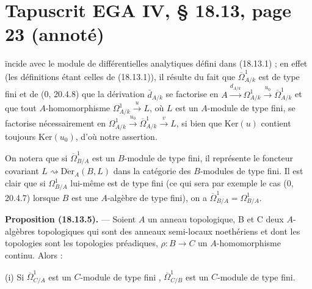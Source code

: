 \documentclass[11pt,a4paper]{article}
\begin{document}
\section*{Tapuscrit EGA IV, § 18.13, page 23 (annoté)}



ïncide avec le module de différentielles analytiques défini dans (18.13.1) ;
en effet  (les définitions étant celles de (18.13.1)), il résulte du fait que
$\overline{\Omega}^1_{A/k}$ est de type fini et de (0, 20.4.8) que la
dérivation $\bar d_{A/k}$ se factorise en $A \xrightarrow{d_{A/k}}
\Omega^1_{A/k} \xrightarrow{u_0} \overline{\Omega}^1_{A/k}$ et que tout
$A$-homomorphisme $\Omega^1_{A/k} \xrightarrow{u} L$, où $L$ est un $A$-module
de type fini, se factorise nécessairement en $\Omega^1_{A/k}
\xrightarrow{u_0} \overline{\Omega}^1_{A/k} \xrightarrow{v} L$, si bien que
$\mathrm{Ker}(u)$ contient toujours $\mathrm{Ker}(u_0)$, d'où notre assertion.

On notera que si $\overline{\Omega}^1_{B/A}$ est un $B$-module de type fini,
il représente le foncteur covariant $L \rightsquigarrow
\mathrm{D\acute{e}r}_A(B, L)$ dans la catégorie des $B$-modules de type fini.
Il est clair que si $\Omega^1_{B/A}$ lui-même est de type fini (ce qui sera
par exemple le cas (0, 20.4.7) lorsque $B$ est une $A$-algèbre de type fini),
on a $\overline{\Omega}^1_{B/A} = \Omega^1_{B/A}$.

\textbf{Proposition (18.13.5).} --- Soient $A$ un anneau topologique,
\struck{\ill{}} B et C deux  $A$-algèbres topologiques qui \struck{\ill{}} sont des  anneaux \struck{\ill{}} semi-locaux noethériens et dont
les topologies sont les topologies préadiques, $\rho : B \to C$ un
$A$-homomorphisme continu. Alors :

(i) Si \struck{\ill{}} $\overline{\Omega}^1_{C/A}$ est un $C$-module de type
fini \struck{\ill{}}, $\overline{\Omega}^1_{C/B}$ est un $C$-module de type
fini.
\end{document}
